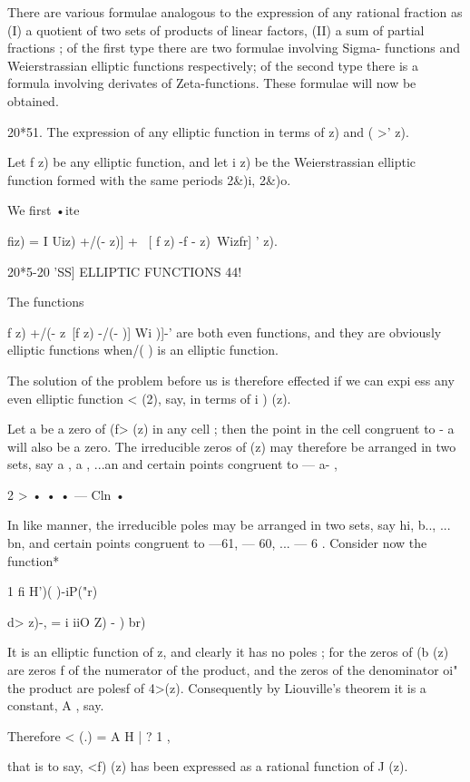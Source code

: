 {There are various formulae analogous to the expression of any rational 
fraction as (I) a quotient of two sets of products of linear factors, (II) a sum 
of partial fractions ; of the first type there are two formulae involving Sigma- 
functions and Weierstrassian elliptic functions respectively; of the second 
type there is a formula involving derivates of Zeta-functions. These formulae 
will now be obtained. 

20*51. The expression of any elliptic function in terms of   z) and  ( >'  z). 

Let f z) be any elliptic function, and let i   z) be the Weierstrassian 
elliptic function formed with the same periods 2\&)i, 2\&)o. 

We first   •ite 

fiz) = I Uiz) +/(- z)] + \ [ f z) -f - z)\ Wizfr]  ' z). 



20*5-20 'SS] ELLIPTIC FUNCTIONS 44!  

The functions 

f z) +/(- z\ [f z) -/(-  )] Wi )]-' 
are both even functions, and they are obviously elliptic functions when/( ) is 
an elliptic function. 

The solution of the problem before us is therefore effected if we can 
expi ess any even elliptic function <  (2), say, in terms of i ) (z). 

Let a be a zero of (f> (z) in any cell ; then the point in the cell congruent 
to - a will also be a zero. The irreducible zeros of   (z) may therefore be 
arranged in two sets, say a , a , ...an and certain points congruent to — a- , 

 2 > • • • — Cln • 

In like manner, the irreducible poles may be arranged in two sets, say 
hi, b.., ... bn, and certain points congruent to —61, — 60, ... — 6 . 
Consider now the function* 

1 fi H')( )-iP("r) 



d> z)-, = i iiO  Z) -  )  br)  

It is an elliptic function of z, and clearly it has no poles ; for the zeros of 
(b (z) are zeros f of the numerator of the product, and the zeros of the 
denominator oi" the product are polesf of 4>(z). Consequently by Liouville's 
theorem it is a constant, A , say. 

Therefore <  (.) = A H |  ? 1 , 

that is to say, <f) (z) has been expressed as a rational function of  J (z). 

}
